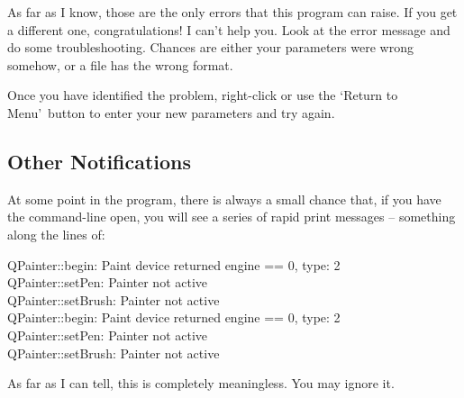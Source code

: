 \documentclass[10pt]{article}
\begin{document}
As far as I know, those are the only errors that this program can raise. If you get a different one, congratulations! I can't help you. Look at the error message and do some troubleshooting. Chances are either your parameters were wrong somehow, or a file has the wrong format.

Once you have identified the problem, right-click or use the \lq Return to Menu\rq\ button to enter your new parameters and try again.

\subsection{Other Notifications}

At some point in the program, there is always a small chance that, if you have the command-line open, you will see a series of rapid print messages -- something along the lines of:

{\selectfont
    \indent QPainter::begin: Paint device returned engine == 0, type: 2\\
    \indent QPainter::setPen: Painter not active\\
    \indent QPainter::setBrush: Painter not active\\
    \indent QPainter::begin: Paint device returned engine == 0, type: 2\\
    \indent QPainter::setPen: Painter not active\\
    \indent QPainter::setBrush: Painter not active
}

As far as I can tell, this is completely meaningless. You may ignore it.
\end{document}
